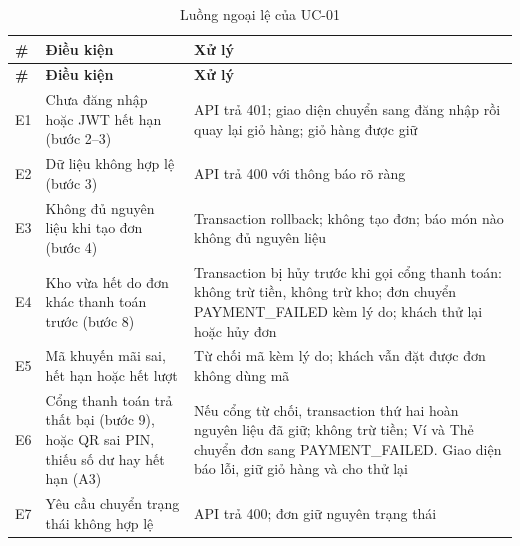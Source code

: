 {\small
\begin{longtable}{@{}L{0.9cm}L{4.4cm}L{8.6cm}@{}}
\caption{Luồng ngoại lệ của UC-01}\label{tab:ucex}\\
\toprule
\textbf{\#} & \textbf{Điều kiện} & \textbf{Xử lý} \\ \midrule \endfirsthead
\toprule \textbf{\#} & \textbf{Điều kiện} & \textbf{Xử lý} \\ \midrule \endhead
\bottomrule \endfoot
E1 & Chưa đăng nhập hoặc JWT hết hạn (bước 2--3) & API trả 401; giao diện chuyển sang đăng nhập rồi quay lại giỏ hàng; giỏ hàng được giữ \\
E2 & Dữ liệu không hợp lệ (bước 3) & API trả 400 với thông báo rõ ràng \\
E3 & Không đủ nguyên liệu khi tạo đơn (bước 4) & Transaction rollback; không tạo đơn; báo món nào không đủ nguyên liệu \\
E4 & Kho vừa hết do đơn khác thanh toán trước (bước 8) & Transaction bị hủy trước khi gọi cổng thanh toán: không trừ tiền, không trừ kho; đơn chuyển PAYMENT\_FAILED kèm lý do; khách thử lại hoặc hủy đơn \\
E5 & Mã khuyến mãi sai, hết hạn hoặc hết lượt & Từ chối mã kèm lý do; khách vẫn đặt được đơn không dùng mã \\
E6 & Cổng thanh toán trả thất bại (bước 9), hoặc QR sai PIN, thiếu số dư hay hết hạn (A3) & Nếu cổng từ chối, transaction thứ hai hoàn nguyên liệu đã giữ; không trừ tiền; Ví và Thẻ chuyển đơn sang PAYMENT\_FAILED. Giao diện báo lỗi, giữ giỏ hàng và cho thử lại \\
E7 & Yêu cầu chuyển trạng thái không hợp lệ & API trả 400; đơn giữ nguyên trạng thái \\
\end{longtable}
}